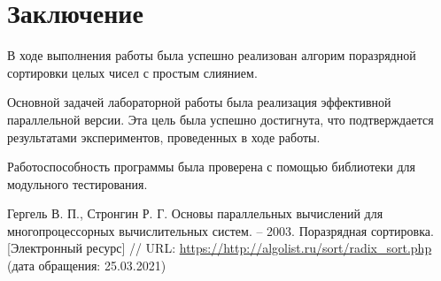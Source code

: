 \documentclass{report}
\begin{document}
\section*{Заключение}
В ходе выполнения работы была успешно реализован алгорим поразрядной сортировки целых чисел с простым слиянием.
\par 
Основной задачей лабораторной работы была реализация эффективной параллельной версии. Эта цель была успешно достигнута, что подтверждается результатами экспериментов, проведенных в ходе работы. 
\par 
Работоспособность программы была проверена с помощью библиотеки для модульного тестирования.
\newpage

\begin{thebibliography}{1}
Гергель В. П., Стронгин Р. Г. Основы параллельных вычислений для многопроцессорных вычислительных систем. – 2003.
 Поразрядная сортировка. [Электронный ресурс] // URL: \url {https://http://algolist.ru/sort/radix_sort.php} (дата обращения: 25.03.2021)
\end{thebibliography}
\newpage

\end{document}
